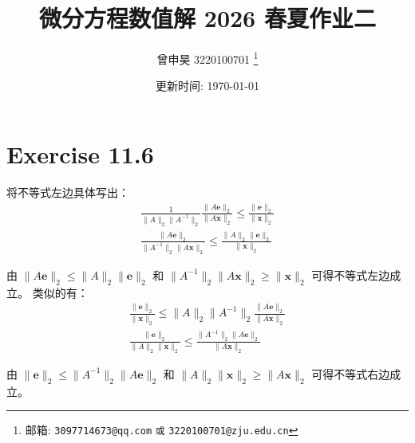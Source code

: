 \documentclass[a4paper]{article}
\begin{document}
\title{微分方程数值解 2026 春夏作业二}

\author{曾申昊 3220100701
  \thanks{邮箱: \texttt{3097714673@qq.com}
                            \texttt{或} \texttt{3220100701@zju.edu.cn}}}

\date{更新时间: \today}

\maketitle

\section*{Exercise 11.6}

\par 将不等式左边具体写出：
\begin{equation}
    \begin{gathered}
        \frac{1}{\lVert A\rVert_2\lVert A^{-1}\rVert_2}
        \frac{\lVert A\bm{e}\rVert_2}{\lVert A\bm{x}\rVert_2}
        \leq \frac{\lVert \bm{e}\rVert_2}{\lVert \bm{x}\rVert_2}\\
        \frac{\lVert A\bm{e}\rVert_2}{\lVert A^{-1}\rVert_2\lVert A\bm{x}\rVert_2}
        \leq \frac{\lVert A\rVert_2\lVert \bm{e}\rVert_2}{\lVert \bm{x}\rVert_2}
    \end{gathered}
\end{equation}
\par 由 $\lVert A\bm{e}\rVert_2\leq \lVert A\rVert_2\lVert \bm{e}\rVert_2$
和 $\lVert A^{-1}\rVert_2\lVert A\bm{x}\rVert_2\geq \lVert \bm{x}\rVert_2$ 可得不等式左边成立。
类似的有：
\begin{equation}
    \begin{gathered}
        \frac{\lVert \bm{e}\rVert_2}{\lVert \bm{x}\rVert_2}
        \leq
        \lVert A\rVert_2\lVert A^{-1}\rVert_2
        \frac{\lVert A\bm{e}\rVert_2}{\lVert A\bm{x}\rVert_2}\\
        \frac{\lVert \bm{e}\rVert_2}{\lVert A\rVert_2\lVert \bm{x}\rVert_2}
        \leq
        \frac{\lVert A^{-1}\rVert_2\lVert A\bm{e}\rVert_2}{\lVert A\bm{x}\rVert_2}
    \end{gathered}
\end{equation}
\par 由 $\lVert \bm{e}\rVert_2\leq \lVert A^{-1}\rVert_2\lVert A\bm{e}\rVert_2$
和 $\lVert A\rVert_2\lVert \bm{x}\rVert_2\geq \lVert A\bm{x}\rVert_2$ 可得不等式右边成立。
\end{document}

